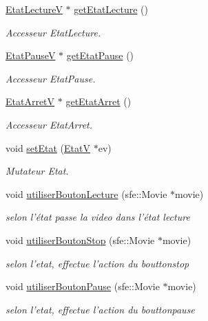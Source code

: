 \begin{DoxyCompactItemize}
\item 
\hyperlink{classEtatLectureV}{Etat\+Lecture\+V} $\ast$ \hyperlink{classVideo_aee3ef41850206dac939f736e5b97c73c}{get\+Etat\+Lecture} ()
\begin{DoxyCompactList}\small\item\em Accesseur Etat\+Lecture. \end{DoxyCompactList}\item 
\hyperlink{classEtatPauseV}{Etat\+Pause\+V} $\ast$ \hyperlink{classVideo_a91f40f05211f5b45e772d8bf68de7562}{get\+Etat\+Pause} ()
\begin{DoxyCompactList}\small\item\em Accesseur Etat\+Pause. \end{DoxyCompactList}\item 
\hyperlink{classEtatArretV}{Etat\+Arret\+V} $\ast$ \hyperlink{classVideo_a84d7495527cd76e6347bf85b2ec6e0ab}{get\+Etat\+Arret} ()
\begin{DoxyCompactList}\small\item\em Accesseur Etat\+Arret. \end{DoxyCompactList}\item 
void \hyperlink{classVideo_a515d17189869141a80223055997179c5}{set\+Etat} (\hyperlink{classEtatV}{Etat\+V} $\ast$ev)
\begin{DoxyCompactList}\small\item\em Mutateur Etat. \end{DoxyCompactList}\item 
\hypertarget{classVideo_a8d3ea9525063ce97483e813e11ce4a6a}{void \hyperlink{classVideo_a8d3ea9525063ce97483e813e11ce4a6a}{utiliser\+Bouton\+Lecture} (sfe\+::\+Movie $\ast$movie)}\label{classVideo_a8d3ea9525063ce97483e813e11ce4a6a}

\begin{DoxyCompactList}\small\item\em selon l'état passe la video dans l'état lecture \end{DoxyCompactList}\item 
\hypertarget{classVideo_a93e76d0b95693e0000035e52775bd6d4}{void \hyperlink{classVideo_a93e76d0b95693e0000035e52775bd6d4}{utiliser\+Bouton\+Stop} (sfe\+::\+Movie $\ast$movie)}\label{classVideo_a93e76d0b95693e0000035e52775bd6d4}

\begin{DoxyCompactList}\small\item\em selon l'etat, effectue l'action du bouttonstop \end{DoxyCompactList}\item 
\hypertarget{classVideo_a78f816a4576618435c101756a96daea0}{void \hyperlink{classVideo_a78f816a4576618435c101756a96daea0}{utiliser\+Bouton\+Pause} (sfe\+::\+Movie $\ast$movie)}\label{classVideo_a78f816a4576618435c101756a96daea0}

\begin{DoxyCompactList}\small\item\em selon l'etat, effectue l'action du bouttonpause \end{DoxyCompactList}\end{DoxyCompactItemize}


